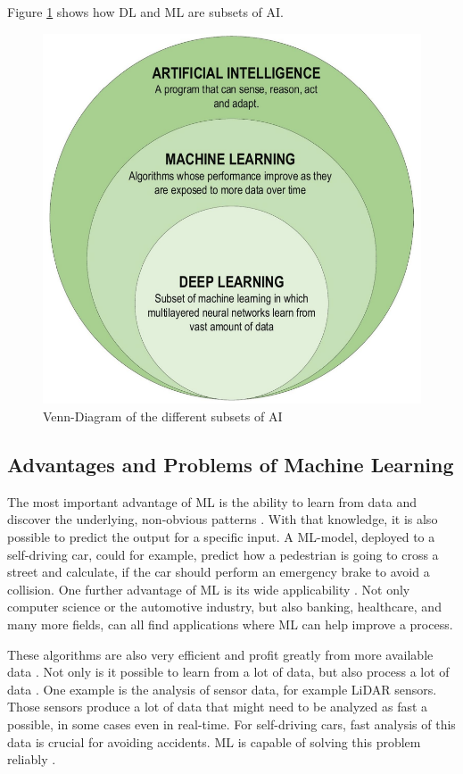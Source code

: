 Figure \ref{fig:AIMLDL} shows how DL and ML are subsets of AI. 

\begin{figure}[H]
	\centering
	\includegraphics[width=0.6\linewidth]{IMGs/AIMLDL.png}
	\caption{Venn-Diagram of the different subsets of AI \cite{Alzubaidi}}
	\label{fig:AIMLDL}
\end{figure}

\subsection{Advantages and Problems of Machine Learning}\label{Advantages and Problems of Machine Learning}
The most important advantage of ML is the ability to learn from data and discover the underlying, non-obvious patterns \cite{Wuest}. With that knowledge, it is also possible to predict the output for a specific input. A ML-model, deployed to a self-driving car, could for example, predict how a pedestrian is going to cross a street and calculate, if the car should perform an emergency brake to avoid a collision. One further advantage of ML is its wide applicability \cite{Thommandru}. Not only computer science or the automotive industry, but also banking, healthcare, and many more fields, can all find applications where ML can help improve a process.

These algorithms are also very efficient and profit greatly from more available data \cite{Janiesch}. Not only is it possible to learn from a lot of data, but also process a lot of data \cite{Wuest}. One example is the analysis of sensor data, for example LiDAR sensors. Those sensors produce a lot of data that might need to be analyzed as fast a possible, in some cases even in real-time. For self-driving cars, fast analysis of this data is crucial for avoiding accidents. ML is capable of solving this problem reliably \cite{Lyu}. 

